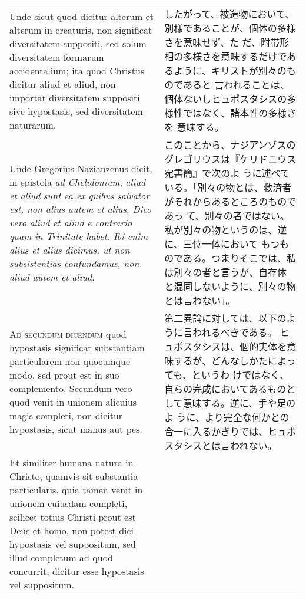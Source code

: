 \documentclass[10pt]{jsarticle} %
\begin{document}
\begin{longtable}{p{21em}p{21em}}
\\





Unde sicut quod dicitur alterum et alterum in creaturis, non
significat diversitatem suppositi, sed solum diversitatem formarum
accidentalium; ita quod Christus dicitur aliud et aliud, non importat
diversitatem suppositi sive hypostasis, sed diversitatem naturarum. 

&

したがって、被造物において、別様であることが、個体の多様さを意味せず、た
 だ、附帯形相の多様さを意味するだけであるように、キリストが別々のものであると
言われることは、個体ないしヒュポスタシスの多様性ではなく、諸本性の多様さを
 意味する。


\\


Unde
Gregorius Nazianzenus dicit, in epistola {\itshape ad Chelidonium}, {\itshape aliud et aliud
sunt ea ex quibus salvator est, non alius autem et alius. Dico vero
aliud et aliud e contrario quam in Trinitate habet. Ibi enim alius et
alius dicimus, ut non subsistentias confundamus, non aliud autem et
aliud}.

&


このことから、ナジアンゾスのグレゴリウスは『ケリドニウス宛書簡』で次のよ
 うに述べている。「別々の物とは、救済者がそれからあるところのものであっ
 て、別々の者ではない。私が別々の物というのは、逆に、三位一体において
 もつものである。つまりそこでは、私は別々の者と言うが、自存体
 と混同しないように、別々の物とは言わない」。

\\



{\scshape Ad secundum dicendum} quod hypostasis significat substantiam particularem
non quocumque modo, sed prout est in suo complemento. Secundum vero quod
venit in unionem alicuius magis completi, non dicitur hypostasis, sicut
manus aut pes. 

&

第二異論に対しては、以下のように言われるべきである。
ヒュポスタシスは、個的実体を意味するが、どんなしかたによっても、というわ
 けではなく、自らの完成においてあるものとして意味する。逆に、手や足のよ
 うに、より完全な何かとの合一に入るかぎりでは、ヒュポスタシスとは言われない。


\\

Et similiter humana natura in Christo, quamvis sit
substantia particularis, quia tamen venit in unionem cuiusdam completi,
scilicet totius Christi prout est Deus et homo, non potest dici
hypostasis vel suppositum, sed illud completum ad quod concurrit,
dicitur esse hypostasis vel suppositum.


\end{longtable}
\end{document}
